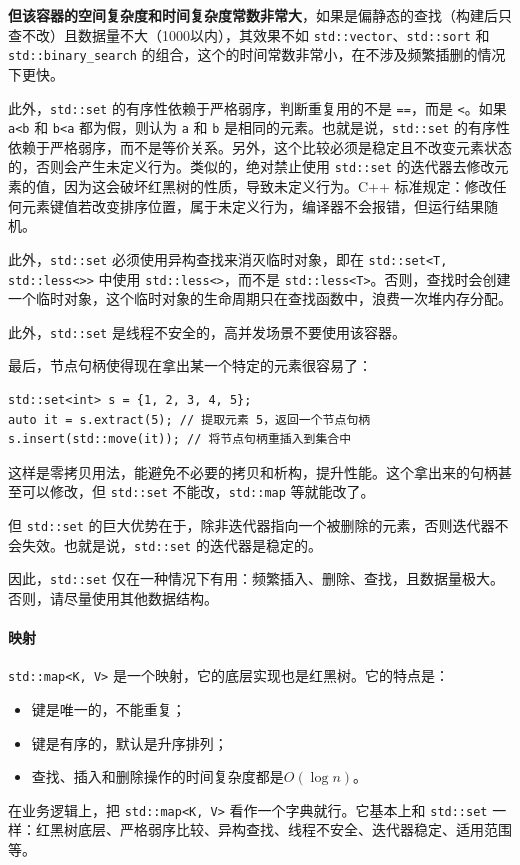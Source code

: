 \textbf{但该容器的空间复杂度和时间复杂度常数非常大}，如果是偏静态的查找（构建后只查不改）且数据量不大（1000以内），其效果不如 \verb|std::vector|、\verb|std::sort| 和 \verb|std::binary_search| 的组合，这个的时间常数非常小，在不涉及频繁插删的情况下更快。

此外，\verb|std::set| 的有序性依赖于严格弱序，判断重复用的不是 \verb|==|，而是 \verb|<|。如果 \verb|a<b| 和 \verb|b<a| 都为假，则认为 \verb|a| 和 \verb|b| 是相同的元素。也就是说，\verb|std::set| 的有序性依赖于严格弱序，而不是等价关系。另外，这个比较必须是稳定且不改变元素状态的，否则会产生未定义行为。类似的，绝对禁止使用 \verb|std::set| 的迭代器去修改元素的值，因为这会破坏红黑树的性质，导致未定义行为。C++ 标准规定：修改任何元素键值若改变排序位置，属于未定义行为，编译器不会报错，但运行结果随机。

此外，\verb|std::set| 必须使用异构查找来消灭临时对象，即在 \verb|std::set<T, std::less<>>| 中使用 \verb|std::less<>|，而不是 \verb|std::less<T>|。否则，查找时会创建一个临时对象，这个临时对象的生命周期只在查找函数中，浪费一次堆内存分配。

此外，\verb|std::set| 是线程不安全的，高并发场景不要使用该容器。

最后，节点句柄使得现在拿出某一个特定的元素很容易了：
\begin{verbatim}
std::set<int> s = {1, 2, 3, 4, 5};
auto it = s.extract(5); // 提取元素 5，返回一个节点句柄
s.insert(std::move(it)); // 将节点句柄重插入到集合中
\end{verbatim}
这样是零拷贝用法，能避免不必要的拷贝和析构，提升性能。这个拿出来的句柄甚至可以修改，但 \verb|std::set| 不能改，\verb|std::map| 等就能改了。

但 \verb|std::set| 的巨大优势在于，除非迭代器指向一个被删除的元素，否则迭代器不会失效。也就是说，\verb|std::set| 的迭代器是稳定的。

因此，\verb|std::set| 仅在一种情况下有用：频繁插入、删除、查找，且数据量极大。否则，请尽量使用其他数据结构。

\paragraph{映射} \verb|std::map<K, V>| 是一个映射，它的底层实现也是红黑树。它的特点是：
\begin{itemize}
    \item 键是唯一的，不能重复；
    \item 键是有序的，默认是升序排列；
    \item 查找、插入和删除操作的时间复杂度都是$O(\log n)$。
\end{itemize}
在业务逻辑上，把 \verb|std::map<K, V>| 看作一个字典就行。它基本上和 \verb|std::set| 一样：红黑树底层、严格弱序比较、异构查找、线程不安全、迭代器稳定、适用范围等。

